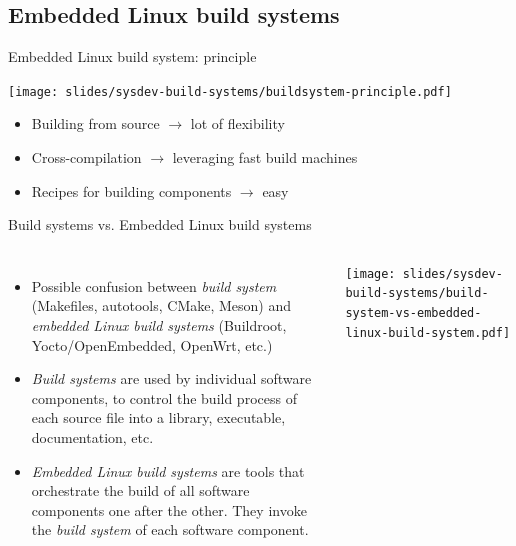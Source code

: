 \subsection{Embedded Linux build systems}

\begin{frame}{Embedded Linux build system: principle}
  \begin{center}
    \texttt{[image: slides/sysdev-build-systems/buildsystem-principle.pdf]}
  \end{center}
  \begin{itemize}
  \item Building from source $\rightarrow$ lot of flexibility
  \item Cross-compilation $\rightarrow$ leveraging fast build machines
  \item Recipes for building components $\rightarrow$ easy
  \end{itemize}
\end{frame}

\begin{frame}{Build systems vs. Embedded Linux build systems}
  \begin{columns}
    \begin{itemize}
    \item Possible confusion between {\em build system} (Makefiles,
      autotools, CMake, Meson) and {\em embedded Linux build systems}
      (Buildroot, Yocto/OpenEmbedded, OpenWrt, etc.)
    \item {\em Build systems} are used by individual software
      components, to control the build process of each source file into
      a library, executable, documentation, etc.
    \item {\em Embedded Linux build systems} are tools that orchestrate
      the build of all software components one after the other. They
      invoke the {\em build system} of each software component.
    \end{itemize}
    \begin{center}
      \texttt{[image: slides/sysdev-build-systems/build-system-vs-embedded-linux-build-system.pdf]}
    \end{center}
  \end{columns}
\end{frame}

